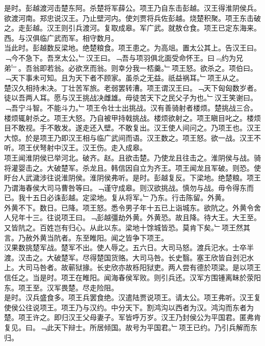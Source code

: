 \documentclass{zhvt-classic}
\begin{document}
\hspace*{2em}是时。彭越渡河击楚东阿。杀楚将军薛公。项王乃自东击彭越。汉王得淮阴侯兵。欲渡河南。郑忠说汉王。乃止壁河内。使刘贾将兵佐彭越。烧楚积聚。项王东击破之。走彭越。汉王则引兵渡河。复取成皋。军广武。就敖仓食。项王已定东海来。西。与汉俱临广武而军。相守数月。\\
\hspace*{2em}当此时。彭越数反梁地。绝楚粮食。项王患之。为高俎。置太公其上。告汉王曰。﹁今不急下。吾烹太公。﹂汉王曰。﹁吾与项羽俱北面受命怀王。曰﹃约为兄弟﹄。吾翁即若翁。必欲烹而翁。则幸分我一桮羹。﹂项王怒。欲杀之。项伯曰。﹁天下事未可知。且为天下者不顾家。虽杀之无益。祇益祸耳。﹂项王从之。\\
\hspace*{2em}楚汉久相持未决。丁壮苦军旅。老弱罢转漕。项王谓汉王曰。﹁天下匈匈数岁者。徒以吾两人耳。愿与汉王挑战决雌雄。毋徒苦天下之民父子为也。﹂汉王笑谢曰。﹁吾宁斗智。不能斗力。﹂项王令壮士出挑战。汉有善骑射者楼烦。楚挑战三合。楼烦辄射杀之。项王大怒。乃自被甲持戟挑战。楼烦欲射之。项王瞋目叱之。楼烦目不敢视。手不敢发。遂走还入壁。不敢复出。汉王使人间问之。乃项王也。汉王大惊。於是项王乃即汉王相与临广武间而语。汉王数之。项王怒。欲一战。汉王不听。项王伏弩射中汉王。汉王伤。走入成皋。\\
\hspace*{2em}项王闻淮阴侯已举河北。破齐。赵。且欲击楚。乃使龙且往击之。淮阴侯与战。骑将灌婴击之。大破楚军。杀龙且。韩信因自立为齐王。项王闻龙且军破。则恐。使盱台人武濊涉往说淮阴侯。淮阴侯弗听。是时。彭越复反。下梁地。绝楚粮。项王乃谓海春侯大司马曹咎等曰。﹁谨守成皋。则汉欲挑战。慎勿与战。毋令得东而已。我十五日必诛彭越。定梁地。复从将军。﹂乃东。行击陈留。外黄。\\
\hspace*{2em}外黄不下。数日。已降。项王怒。悉令男子年十五已上诣城东。欲阬之。外黄令舍人兒年十三。往说项王曰。﹁彭越彊劫外黄。外黄恐。故且降。待大王。大王至。又皆阬之。百姓岂有归心。从此以东。梁地十馀城皆恐。莫肯下矣。﹂项王然其言。乃赦外黄当阬者。东至睢阳。闻之皆争下项王。\\
\hspace*{2em}汉果数挑楚军战。楚军不出。使人辱之。五六日。大司马怒。渡兵汜水。士卒半渡。汉击之。大破楚军。尽得楚国货赂。大司马咎。长史翳。塞王欣皆自刭汜水上。大司马咎者。故蕲狱掾。长史欣亦故栎阳狱吏。两人尝有德於项梁。是以项王信任之。当是时。项王在睢阳。闻海春侯军败。则引兵还。汉军方围锺离眛於荥阳东。项王至。汉军畏楚。尽走险阻。\\
\hspace*{2em}是时。汉兵盛食多。项王兵罢食绝。汉遣陆贾说项王。请太公。项王弗听。汉王复使侯公往说项王。项王乃与汉约。中分天下。割鸿沟以西者为汉。鸿沟而东者为楚。项王许之。即归汉王父母妻子。军皆呼万岁。汉王乃封侯公为平国君。匿弗肯复见。曰。﹁此天下辩士。所居倾国。故号为平国君。﹂项王已约。乃引兵解而东归。\\
\end{document}
